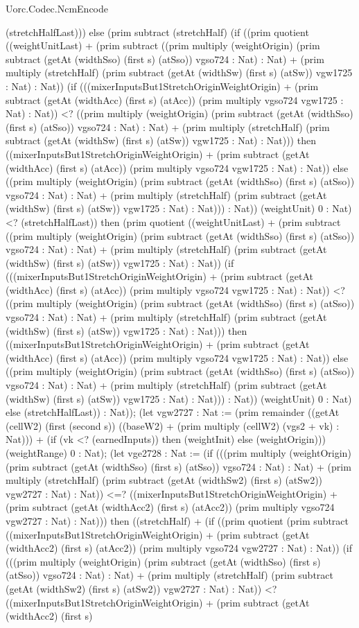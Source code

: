 \begin{lexlean}{Uorc.Codec.NcmEncode}
\begin{semanticmodule}
{(stretchHalfLast))) else (prim subtract (stretchHalf) (if ((prim quotient ((weightUnitLast) + (prim subtract ((prim multiply (weightOrigin) (prim subtract (getAt (widthSso) (first s) (atSso)) vgso724 : Nat) : Nat) + (prim multiply (stretchHalf) (prim subtract (getAt (widthSw) (first s) (atSw)) vgw1725 : Nat) : Nat)) (if (((mixerInputsBut1StretchOriginWeightOrigin) + (prim subtract (getAt (widthAcc) (first s) (atAcc)) (prim multiply vgso724 vgw1725 : Nat) : Nat)) <? ((prim multiply (weightOrigin) (prim subtract (getAt (widthSso) (first s) (atSso)) vgso724 : Nat) : Nat) + (prim multiply (stretchHalf) (prim subtract (getAt (widthSw) (first s) (atSw)) vgw1725 : Nat) : Nat))) then ((mixerInputsBut1StretchOriginWeightOrigin) + (prim subtract (getAt (widthAcc) (first s) (atAcc)) (prim multiply vgso724 vgw1725 : Nat) : Nat)) else ((prim multiply (weightOrigin) (prim subtract (getAt (widthSso) (first s) (atSso)) vgso724 : Nat) : Nat) + (prim multiply (stretchHalf) (prim subtract (getAt (widthSw) (first s) (atSw)) vgw1725 : Nat) : Nat))) : Nat)) (weightUnit) 0 : Nat) <? (stretchHalfLast)) then (prim quotient ((weightUnitLast) + (prim subtract ((prim multiply (weightOrigin) (prim subtract (getAt (widthSso) (first s) (atSso)) vgso724 : Nat) : Nat) + (prim multiply (stretchHalf) (prim subtract (getAt (widthSw) (first s) (atSw)) vgw1725 : Nat) : Nat)) (if (((mixerInputsBut1StretchOriginWeightOrigin) + (prim subtract (getAt (widthAcc) (first s) (atAcc)) (prim multiply vgso724 vgw1725 : Nat) : Nat)) <? ((prim multiply (weightOrigin) (prim subtract (getAt (widthSso) (first s) (atSso)) vgso724 : Nat) : Nat) + (prim multiply (stretchHalf) (prim subtract (getAt (widthSw) (first s) (atSw)) vgw1725 : Nat) : Nat))) then ((mixerInputsBut1StretchOriginWeightOrigin) + (prim subtract (getAt (widthAcc) (first s) (atAcc)) (prim multiply vgso724 vgw1725 : Nat) : Nat)) else ((prim multiply (weightOrigin) (prim subtract (getAt (widthSso) (first s) (atSso)) vgso724 : Nat) : Nat) + (prim multiply (stretchHalf) (prim subtract (getAt (widthSw) (first s) (atSw)) vgw1725 : Nat) : Nat))) : Nat)) (weightUnit) 0 : Nat) else (stretchHalfLast)) : Nat)); (let vgw2727 : Nat := (prim remainder ((getAt (cellW2) (first (second s)) ((baseW2) + (prim multiply (cellW2) (vgs2 + vk) : Nat))) + (if (vk <? (earnedInputs)) then (weightInit) else (weightOrigin))) (weightRange) 0 : Nat); (let vge2728 : Nat := (if (((prim multiply (weightOrigin) (prim subtract (getAt (widthSso) (first s) (atSso)) vgso724 : Nat) : Nat) + (prim multiply (stretchHalf) (prim subtract (getAt (widthSw2) (first s) (atSw2)) vgw2727 : Nat) : Nat)) <=? ((mixerInputsBut1StretchOriginWeightOrigin) + (prim subtract (getAt (widthAcc2) (first s) (atAcc2)) (prim multiply vgso724 vgw2727 : Nat) : Nat))) then ((stretchHalf) + (if ((prim quotient (prim subtract ((mixerInputsBut1StretchOriginWeightOrigin) + (prim subtract (getAt (widthAcc2) (first s) (atAcc2)) (prim multiply vgso724 vgw2727 : Nat) : Nat)) (if (((prim multiply (weightOrigin) (prim subtract (getAt (widthSso) (first s) (atSso)) vgso724 : Nat) : Nat) + (prim multiply (stretchHalf) (prim subtract (getAt (widthSw2) (first s) (atSw2)) vgw2727 : Nat) : Nat)) <? ((mixerInputsBut1StretchOriginWeightOrigin) + (prim subtract (getAt (widthAcc2) (first s) }
\end{semanticmodule}
\end{lexlean}
